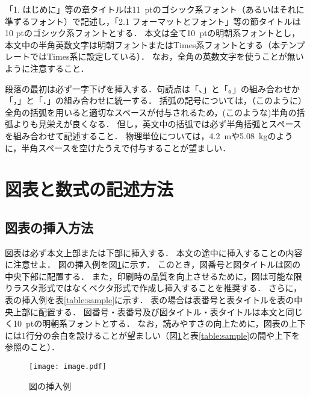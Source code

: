 \documentclass[a4j]{jsarticle}
\begin{document}
「1. はじめに」等の章タイトルは11~ptのゴシック系フォント（あるいはそれに準ずるフォント）で記述し，「2.1 フォーマットとフォント」等の節タイトルは10 ptのゴシック系フォントとする．
本文は全て10~ptの明朝系フォントとし，本文中の半角英数文字は明朝フォントまたはTimes系フォントとする（本テンプレートではTimes系に設定している）．
なお，全角の英数文字を使うことが無いように注意すること．

段落の最初は必ず一字下げを挿入する．句読点は「、」と「。」の組み合わせか「，」と「．」の組み合わせに統一する．
括弧の記号については，（このように）全角の括弧を用いると適切なスペースが付与されるため，(このような)半角の括弧よりも見栄えが良くなる．
但し，英文中の括弧では必ず半角括弧とスペースを組み合わせて記述すること．
物理単位については，4.2~mや5.08~kgのように，半角スペースを空けたうえで付与することが望ましい．

\section{図表と数式の記述方法}

\subsection{図表の挿入方法}

図表は必ず本文上部または下部に挿入する．
本文の途中に挿入することの内容に注意せよ．
図の挿入例を図\ref{fig:sample}に示す．
このとき，図番号と図タイトルは図の中央下部に配置する．
また，印刷時の品質を向上させるために，図は可能な限りラスタ形式ではなくベクタ形式で作成し挿入することを推奨する．
さらに，表の挿入例を表\ref{table:sample}に示す．
表の場合は表番号と表タイトルを表の中央上部に配置する．
図番号・表番号及び図タイトル・表タイトルは本文と同じく10~ptの明朝系フォントとする．
なお，読みやすさの向上ために，図表の上下には1行分の余白を設けることが望ましい（図\ref{fig:sample}と表\ref{table:sample}の間や上下を参照のこと）．

\begin{figure}[t]
  \centering
  \vspace{0pt} %
  \texttt{[image: image.pdf]}
  \vspace{0pt} %
  \caption{図の挿入例}
  \vspace{0pt} %
  \label{fig:sample}
\end{figure}
\end{document}
